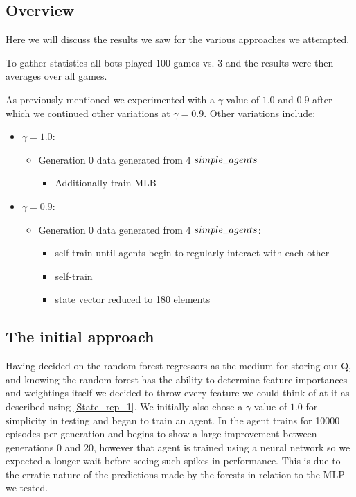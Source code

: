 \subsection{Overview}
Here we will discuss the results we saw for the various approaches we attempted.

To gather statistics all bots played $100$ games vs. $3$  and the results were then averages over all games.

As previously mentioned we experimented with a $\gamma$ value of $1.0$ and $0.9$ after which we continued other variations at $\gamma = 0.9$.
Other variations include:
\begin{itemize}
	\item $\gamma = 1.0$:
	\begin{itemize}
		\item Generation 0 data generated from 4 $\code{simple\_agents}$
		\begin{itemize}
			\item Additionally train MLB
		\end{itemize}
	\end{itemize}
	\item $\gamma = 0.9$:
	\begin{itemize}
		\item Generation 0 data generated from 4 $\code{simple\_agents}$:
		\begin{itemize}
			\item self-train until agents begin to regularly interact with each other
			\item self-train
			\item state vector reduced to 180 elements
		\end{itemize}
	\end{itemize}
\end{itemize}

\subsection{The initial approach}
Having decided on the random forest regressors as the medium for storing our Q, and knowing the random forest has the ability to determine feature importances and weightings itself we decided to throw every feature we could think of at it as described using \ref{State_rep_1}. We initially also chose a $\gamma$ value of $1.0$ for simplicity in testing and began to train an agent. In \cite{paper} the agent trains for 10000 episodes per generation and begins to show a large improvement between generations $0$ and $20$, however that agent is trained using a neural network so we expected a longer wait before seeing such spikes in performance. This is due to the erratic nature of the predictions made by the forests in relation to the MLP we tested.


